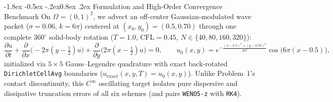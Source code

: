\documentclass[11pt,a4paper]{article}
\makeatletter
\renewcommand{\subsection}{\@startsection{subsection}{2}{\z@}%
  {-1.8ex \@plus -0.5ex \@minus -.2ex}{0.8ex \@plus .2ex}%
  {\normalfont\normalsize\bfseries\color{specnavy}}}
\newcommand{\code}[1]{\texttt{#1}}
\theoremstyle{definition}
\makeatother
\begin{document}
\subsection{Formulation and High-Order Convergence Benchmark}
On $\Omega=(0,1)^2$, we advect an off-center Gaussian-modulated wave packet ($\sigma=0.06$, $k=6\pi$) centered at $(x_0,y_0)=(0.5,0.70)$ through one complete $360^\circ$ solid-body rotation ($T=1.0$, $\mathrm{CFL}=0.45$, $N\in\{40,80,160,320\}$):
\begin{equation}
\label{eq:p2}
\frac{\partial u}{\partial t} + \frac{\partial}{\partial x}\bigl(-2\pi(y-\tfrac{1}{2})u\bigr) + \frac{\partial}{\partial y}\bigl(2\pi(x-\tfrac{1}{2})u\bigr) = 0, \qquad
u_0(x,y) = e^{-\frac{(x-0.5)^2 + (y-0.70)^2}{2\sigma^2}}\cos\!\bigl(6\pi(x-0.5)\bigr),
\end{equation}
initialized via $5\times 5$ Gauss--Legendre quadrature with exact back-rotated \code{DirichletCellAvg} boundaries ($u_{\text{exact}}(x,y,T)=u_0(x,y)$). Unlike Problem~1's contact discontinuity, this $C^\infty$ oscillating target isolates pure dispersive and dissipative truncation errors of all six schemes (and pairs \code{WENO5-z} with \code{RK4}).
\end{document}
